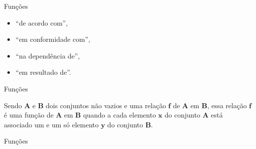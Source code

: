 \documentclass[11pt, openright, a4paper, brazil, english, french, spanish, bibjustif, xcolor=table,aspectratio=169]{beamer}
\begin{document}
\begin{frame}[t]{Funções}

\medskip

\begin{minipage}{\columnwidth}

\pause


\pause

\begin{itemize}[label=$\bullet$]

\item ``de acordo com'',

\pause

\item ``em conformidade com'',

\pause

\item ``na dependência de'',

\pause

\item ``em resultado de''.

\end{itemize}


\end{minipage}

\end{frame}

\begin{frame}[t]{Funções}

\medskip

\begin{minipage}{\columnwidth}

Sendo $\textbf{A}$ e $\textbf{B}$ dois conjuntos não vazios e uma relação $\textbf{f}$ de $\textbf{A}$ em $\textbf{B}$, essa relação $\textbf{f}$ é uma função de $\textbf{A}$ em $\textbf{B}$ quando a cada elemento $\textbf{x}$ do conjunto $\textbf{A}$ está associado um e um só elemento $\textbf{y}$ do conjunto $\textbf{B}$.


\end{minipage}

\end{frame}


\begin{frame}[t]{Funções}


\end{frame}
\end{document}
